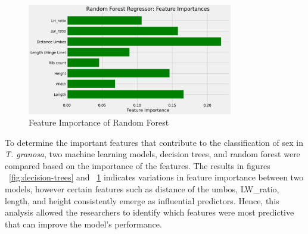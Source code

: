 \begin{figure}[!htbp]
	\centering
	\includegraphics[width=0.8\textwidth]{figures/random-forest.png}
	\caption{Feature Importance of Random Forest}
	\label{fig:random-forest}
\end{figure}

To determine the important features that contribute to the classification of sex in \textit{T. granosa}, two machine learning models, decision trees, and random forest were compared based on the importance of the features. The results in figures ~\ref{fig:decision-trees} and ~\ref{fig:random-forest} indicates variations in feature importance between two models, however certain features such as distance of the umbos, LW\_ratio, length, and height consistently emerge as influential predictors. Hence, this analysis allowed the researchers to identify which features were most predictive that can improve the model’s performance. 


